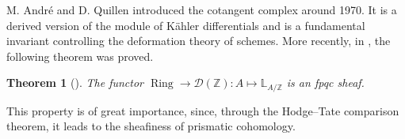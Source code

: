 \documentclass[11pt, a4paper]{amsart}
\theoremstyle{plain}
\newtheorem{theorem}{Theorem}[section]
\theoremstyle{definition}
\begin{document}


M. André and D. Quillen introduced the cotangent complex around 1970. It is a derived version of the module of Kähler differentials and is a fundamental invariant controlling the deformation theory of schemes. More recently, in \cite{BMS19}, the following theorem was proved.
\begin{theorem}[\cite{BMS19}]
    The functor $\operatorname{Ring}\to \mathcal{D}(\mathbb Z):A\mapsto \mathbb L_{A/\mathbb Z}$ is an fpqc sheaf.
\end{theorem}
This property is of great importance, since, through the Hodge--Tate comparison theorem, it leads to the sheafiness of prismatic cohomology.
\end{document}
